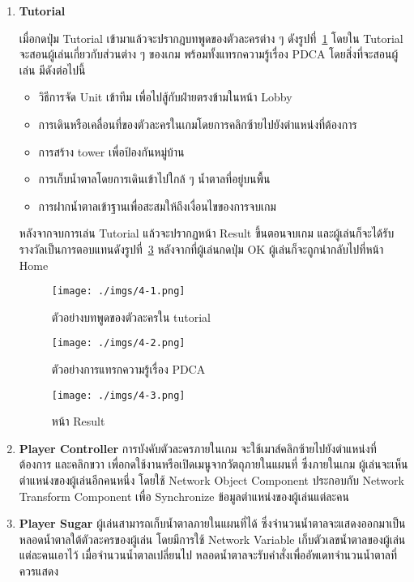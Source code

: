 \documentclass[12pt,oneside,openright,a4paper]{cpe-thai-project}
\begin{document}
\begin{enumerate}
  \item \textbf{Tutorial}
  
  เมื่อกดปุ่ม Tutorial เข้ามาแล้วจะปรากฎบทพูดของตัวละครต่าง ๆ ดังรูปที่~\ref{fig:4-1}
  โดยใน Tutorial จะสอนผู้เล่นเกี่ยวกับส่วนต่าง ๆ ของเกม พร้อมทั้งแทรกความรู้เรื่อง PDCA 
  โดยสิ่งที่จะสอนผู้เล่น มีดังต่อไปนี้
  \begin{itemize}
    \item วิธีการจัด Unit เข้าทีม เพื่อไปสู้กับฝ่ายตรงข้ามในหน้า Lobby 
    \item การเดินหรือเคลื่อนที่ของตัวละครในเกมโดยการคลิกซ้ายไปยังตำแหน่งที่ต้องการ
    \item การสร้าง tower เพื่อป้องกันหมู่บ้าน
    \item การเก็บน้ำตาลโดยการเดินเข้าไปใกล้ ๆ น้ำตาลที่อยู่บนพื้น
    \item การฝากน้ำตาลเข้าฐานเพื่อสะสมให้ถึงเงื่อนไขของการจบเกม
  \end{itemize}

  หลังจากจบการเล่น Tutorial แล้วจะปรากฏหน้า Result ขึ้นตอนจบเกม
  และผู้เล่นก็จะได้รับรางวัลเป็นการตอบแทนดังรูปที่~\ref{fig:4-3} หลังจากที่ผู้เล่นกดปุ่ม OK 
  ผู้เล่นก็จะถูกนำกลับไปที่หน้า Home

  \begin{figure}[H]\centering
    \texttt{[image: ./imgs/4-1.png]}
    \caption{ตัวอย่างบทพูดของตัวละครใน tutorial}\label{fig:4-1}
  \end{figure}

  \begin{figure}[H]\centering
    \texttt{[image: ./imgs/4-2.png]}
    \caption{ตัวอย่างการแทรกความรู้เรื่อง PDCA}\label{fig:4-2}
  \end{figure}

  \begin{figure}[H]\centering
    \texttt{[image: ./imgs/4-3.png]}
    \caption{หน้า Result}\label{fig:4-3}
  \end{figure}

  \item \textbf{Player Controller}
    การบังคับตัวละครภายในเกม จะใช้เมาส์คลิกซ้ายไปยังตำแหน่งที่ต้องการ 
    และคลิกขวา เพื่อกดใช้งานหรือเปิดเมนูจากวัตถุภายในแผนที่ ซึ่งภายในเกม
    ผู้เล่นจะเห็นตำแหน่งของผู้เล่นอีกคนหนึ่ง โดยใช้ Network Object Component 
    ประกอบกับ Network Transform Component เพื่อ Synchronize ข้อมูลตำแหน่งของผู้เล่นแต่ละคน

  \item \textbf{Player Sugar}
    ผู้เล่นสามารถเก็บน้ำตาลภายในแผนที่ได้ ซึ่งจำนวนน้ำตาลจะแสดงออกมาเป็นหลอดน้ำตาลใต้ตัวละครของผู้เล่น 
    โดยมีการใช้  Network Variable เก็บตัวเลขน้ำตาลของผู้เล่นแต่ละคนเอาไว้ เมื่อจำนวนน้ำตาลเปลี่ยนไป 
    หลอดน้ำตาลจะรับคำสั่งเพื่ออัพเดทจำนวนน้ำตาลที่ควรแสดง 


\end{enumerate}
\end{document}
